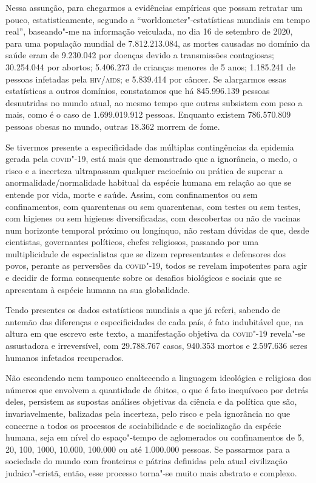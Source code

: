 Nessa assunção, para chegarmos a evidências empíricas que possam
retratar um pouco, estatisticamente, segundo a
``worldometer"-estatísticas mundiais em tempo real'', baseando"-me na
informação veiculada, no dia 16 de setembro de 2020, para uma população
mundial de 7.812.213.084, as mortes causadas no domínio da saúde eram de
9.230.042 por doenças devido a transmissões contagiosas; 30.254.044 por
abortos; 5.406.273 de crianças menores de 5 anos; 1.185.241 de pessoas
infetadas pela \textsc{hiv}/\textsc{aids}; e 5.839.414 por câncer. Se alargarmos essas
estatísticas a outros domínios, constatamos que há 845.996.139 pessoas
desnutridas no mundo atual, ao mesmo tempo que outras subsistem com peso
a mais, como é o caso de 1.699.019.912 pessoas. Enquanto existem
786.570.809 pessoas obesas no mundo, outras 18.362 morrem de fome.

Se tivermos presente a especificidade das múltiplas contingências da
epidemia gerada pela \textsc{covid}"-19, está mais que demonstrado que a
ignorância, o medo, o risco e a incerteza ultrapassam qualquer
raciocínio ou prática de superar a anormalidade/normalidade habitual da
espécie humana em relação ao que se entende por vida, morte e saúde.
Assim, com confinamentos ou sem confinamentos, com quarentenas ou sem
quarentenas, com testes ou sem testes, com higienes ou sem higienes
diversificadas, com descobertas ou não de vacinas num horizonte temporal
próximo ou longínquo, não restam dúvidas de que, desde cientistas,
governantes políticos, chefes religiosos, passando por uma
multiplicidade de especialistas que se dizem representantes e defensores
dos povos, perante as perversões da \textsc{covid}"-19, todos se revelam
impotentes para agir e decidir de forma consequente sobre os desafios
biológicos e sociais que se apresentam à espécie humana na sua
globalidade.

Tendo presentes os dados estatísticos mundiais a que já referi, sabendo
de antemão das diferenças e especificidades de cada país, é fato
indubitável que, na altura em que escrevo este texto, a manifestação
objetiva da \textsc{covid}"-19 revela"-se assustadora e irreversível, com
29.788.767 casos, 940.353 mortos e 2.597.636 seres humanos infetados
recuperados.

Não escondendo nem tampouco enaltecendo a linguagem ideológica e
religiosa dos números que envolvem a quantidade de óbitos, o que é fato
inequívoco por detrás deles, persistem as supostas análises objetivas da
ciência e da política que são, invariavelmente, balizadas pela
incerteza, pelo risco e pela ignorância no que concerne a todos os
processos de sociabilidade e de socialização da espécie humana, seja em
nível do espaço"-tempo de aglomerados ou confinamentos de 5, 20, 100,
1000, 10.000, 100.000 ou até 1.000.000 pessoas. Se passarmos para a
sociedade do mundo com fronteiras e pátrias definidas pela atual
civilização judaico"-cristã, então, esse processo torna"-se muito mais
abstrato e complexo.

